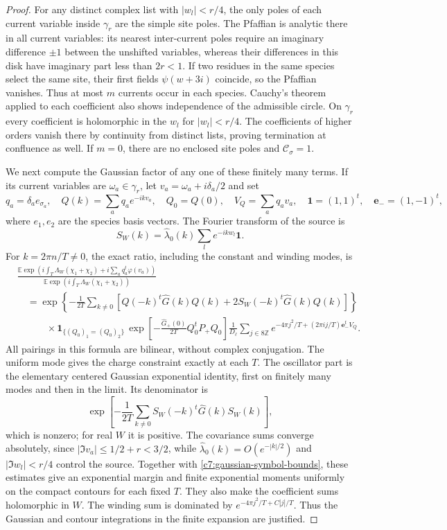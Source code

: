 \begin{proof}
For any distinct complex list with $|w_l|<r/4$, the only poles of each current variable inside $\gamma_r$ are the simple site poles. The Pfaffian is analytic there in all current variables: its nearest inter-current poles require an imaginary difference $\pm1$ between the unshifted variables, whereas their differences in this disk have imaginary part less than $2r<1$. If two residues in the same species select the same site, their first fields $\psi(w+3i)$ coincide, so the Pfaffian vanishes. Thus at most $m$ currents occur in each species. Cauchy's theorem applied to each coefficient also shows independence of the admissible circle. On $\gamma_r$ every coefficient is holomorphic in the $w_l$ for $|w_l|<r/4$. The coefficients of higher orders vanish there by continuity from distinct lists, proving termination at confluence as well. If $m=0$, there are no enclosed site poles and $\mathcal C_\sigma=1$.

We next compute the Gaussian factor of any one of these finitely many terms. If its current variables are $\omega_a\in\gamma_r$, let $v_a=\omega_a+i\delta_a/2$ and set
\[
q_a=\delta_a e_{\sigma_a},\quad
Q(k)=\sum_aq_a e^{-ikv_a},\quad Q_0=Q(0),\quad
V_Q=\sum_aq_a v_a,\quad \mathbf1=(1,1)^t,\quad \mathbf e_-=(1,-1)^t,
\]
where $e_1,e_2$ are the species basis vectors. The Fourier transform of the source is
\[
S_W(k)=\widehat\lambda_0(k)\sum_l e^{-ikw_l}\mathbf1.
\]
For $k=2\pi n/T\ne0$, the exact ratio, including the constant and winding modes, is
\begin{equation}\label{c7:gaussian-coefficient}
\begin{aligned}
&\frac{\mathbb E\exp\!\left(
 i\int_T\Lambda_W(\chi_1+\chi_2)+i\sum_aq_a^t\varphi(v_a)\right)}
 {\mathbb E\exp\!\left(i\int_T\Lambda_W(\chi_1+\chi_2)\right)}
\\
&\quad=
\exp\!\left\{-\frac1{2T}\sum_{k\ne0}
 \left[Q(-k)^t\widehat G(k)Q(k)
       +2S_W(-k)^t\widehat G(k)Q(k)\right]\right\}
\\
&\qquad\quad{}\times
\mathbf1_{\{(Q_0)_1=(Q_0)_2\}}\,
\exp\!\left[-\frac{\widehat G_+(0)}{2T}Q_0^tP_+Q_0\right]
\frac1{D_\ell}\sum_{j\in8\mathbb Z}
 e^{-4\pi j^2/T+(2\pi i j/T)\mathbf e_-^tV_Q}.
\end{aligned}
\end{equation}
All pairings in this formula are bilinear, without complex conjugation. The uniform mode gives the charge constraint exactly at each $T$. The oscillator part is the elementary centered Gaussian exponential identity, first on finitely many modes and then in the limit. Its denominator is
\[
\exp\!\left[-\frac1{2T}\sum_{k\ne0}
 S_W(-k)^t\widehat G(k)S_W(k)\right],
\]
which is nonzero; for real $W$ it is positive. The covariance sums converge absolutely, since $|\Im v_a|\le1/2+r<3/2$, while $\widehat\lambda_0(k)=O(e^{-|k|/2})$ and $|\Im w_l|<r/4$ control the source. Together with \eqref{c7:gaussian-symbol-bounds}, these estimates give an exponential margin and finite exponential moments uniformly on the compact contours for each fixed $T$. They also make the coefficient sums holomorphic in $W$. The winding sum is dominated by $e^{-4\pi j^2/T+C|j|/T}$. Thus the Gaussian and contour integrations in the finite expansion are justified.


\end{proof}
